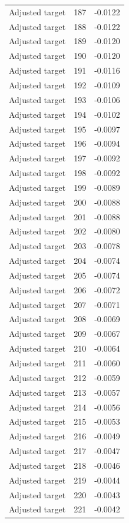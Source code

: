\begin{table}[htbp]
\begin{tabular}{lll}
Adjusted target & 187 & -0.0122 \\
Adjusted target & 188 & -0.0122 \\
Adjusted target & 189 & -0.0120 \\
Adjusted target & 190 & -0.0120 \\
Adjusted target & 191 & -0.0116 \\
Adjusted target & 192 & -0.0109 \\
Adjusted target & 193 & -0.0106 \\
Adjusted target & 194 & -0.0102 \\
Adjusted target & 195 & -0.0097 \\
Adjusted target & 196 & -0.0094 \\
Adjusted target & 197 & -0.0092 \\
Adjusted target & 198 & -0.0092 \\
Adjusted target & 199 & -0.0089 \\
Adjusted target & 200 & -0.0088 \\
Adjusted target & 201 & -0.0088 \\
Adjusted target & 202 & -0.0080 \\
Adjusted target & 203 & -0.0078 \\
Adjusted target & 204 & -0.0074 \\
Adjusted target & 205 & -0.0074 \\
Adjusted target & 206 & -0.0072 \\
Adjusted target & 207 & -0.0071 \\
Adjusted target & 208 & -0.0069 \\
Adjusted target & 209 & -0.0067 \\
Adjusted target & 210 & -0.0064 \\
Adjusted target & 211 & -0.0060 \\
Adjusted target & 212 & -0.0059 \\
Adjusted target & 213 & -0.0057 \\
Adjusted target & 214 & -0.0056 \\
Adjusted target & 215 & -0.0053 \\
Adjusted target & 216 & -0.0049 \\
Adjusted target & 217 & -0.0047 \\
Adjusted target & 218 & -0.0046 \\
Adjusted target & 219 & -0.0044 \\
Adjusted target & 220 & -0.0043 \\
Adjusted target & 221 & -0.0042 \\

\end{tabular}
\end{table}
